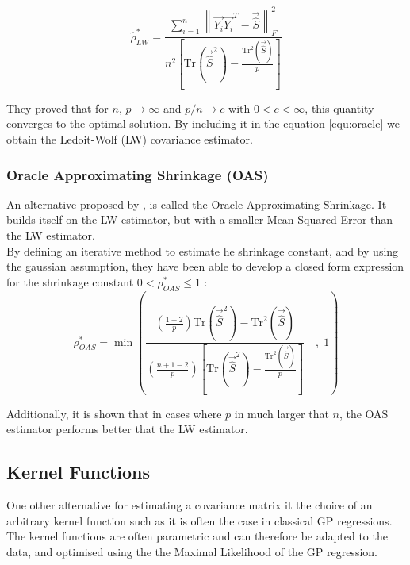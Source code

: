 \begin{equation}
	\hat{\rho}_{LW}^* =  \frac{\sum_{i=1}^n \left\lVert \vec{Y_i}\vec{Y_i}^T - \vec{\hat{S}} \right\rVert_F^2   }{n^2 \left[ \text{Tr}( \vec{\hat{S}} ^2) - \frac{ \text{Tr}^2( \vec{\hat{S}} ) }{p} \right]}
\end{equation}

They proved that for $n,\, p \rightarrow \infty $ and $p/n \rightarrow c $ with $0<c < \infty $, this quantity converges to the optimal solution.  By including it in the equation \ref{equ:oracle} we obtain the Ledoit-Wolf (LW) covariance estimator.



\subsubsection{Oracle Approximating Shrinkage (OAS)}

An alternative proposed by \citet{chen_shrinkage_2010}, is called the Oracle Approximating Shrinkage. It builds itself on the LW estimator, but with a  smaller Mean Squared Error than the LW estimator. \\

By defining an iterative method to estimate he shrinkage constant, and by using the gaussian assumption, they have been able to develop a closed form expression for the shrinkage constant $0 < \rho^*_{OAS}  \leq 1$ : \\

\begin{equation}
	\rho^*_{OAS} = \min \left(   \frac{\left(\frac{1-2}{p}\right) \text{Tr}( \vec{\hat{S}} ^2) -  \text{Tr}^2( \vec{\hat{S}} ) }{\left( \frac{n+1-2}{p}\right)\left[ \text{Tr}( \vec{\hat{S}} ^2) - \frac{ \text{Tr}^2( \vec{\hat{S}} ) }{p} \right] } \quad , \; 1\right)
	\label{equ:cov:shrink:oas}
\end{equation}

Additionally, it is shown that in cases where $p$ in much larger that $n$, the OAS estimator performs better that the LW estimator. 



\subsection{Kernel Functions}


One other alternative for estimating a covariance matrix it the choice of an arbitrary kernel function such as it is often the case in classical GP regressions. The kernel functions are often parametric and can therefore be adapted to the data, and optimised using the the Maximal Likelihood of the GP regression.  \\ 

